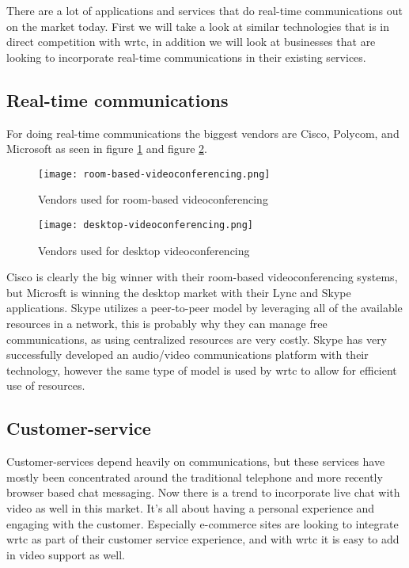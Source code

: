 There are a lot of applications and services that do real-time communications out on the market today. First we will take a look at similar technologies\cite{lopez_fernandez_catalysing_2013} that is in direct competition with \gls{wrtc}, in addition we will look at businesses that are looking to incorporate real-time communications in their existing services.

\subsection{Real-time communications}
For doing real-time communications the biggest vendors are Cisco, Polycom, and Microsoft as seen in figure \ref{fig:room-based-videoconferencing} and figure \ref{fig:desktop-videoconferencing}.

\begin{figure}[here]
\centerline{\texttt{[image: room-based-videoconferencing.png]}}
\label{fig:room-based-videoconferencing}
\caption{Vendors used for room-based videoconferencing}
\end{figure}

\begin{figure}[here]
\centerline{\texttt{[image: desktop-videoconferencing.png]}}
\caption{Vendors used for desktop videoconferencing}
\label{fig:desktop-videoconferencing}
\end{figure}

Cisco is clearly the big winner with their room-based videoconferencing systems, but Microsft is winning the desktop market with their Lync and Skype applications. Skype utilizes a peer-to-peer model by leveraging all of the available resources in a network, this is probably why they can manage free communications, as using centralized resources are very costly. Skype has very successfully developed an audio/video communications platform with their technology, however the same type of model is used by \gls{wrtc} to allow for efficient use of resources.

\subsection{Customer-service}
Customer-services depend heavily on communications, but these services have mostly been concentrated around the traditional telephone and more recently browser based chat messaging. Now there is a trend to incorporate live chat with video as well in this market\cite{amazon_mayday}. It's all about having a personal experience and engaging with the customer. Especially e-commerce sites are looking to integrate \gls{wrtc} as part of their customer service experience, and with \gls{wrtc} it is easy to add in video support as well.

